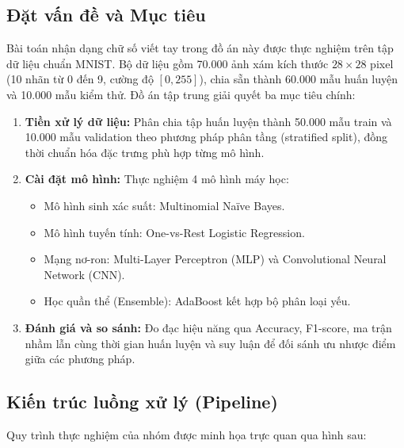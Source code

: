 \documentclass[11pt,a4paper]{article}
\begin{document}
\subsection{Đặt vấn đề và Mục tiêu}
Bài toán nhận dạng chữ số viết tay trong đồ án này được thực nghiệm trên tập dữ liệu chuẩn MNIST. Bộ dữ liệu gồm 70.000 ảnh xám kích thước $28 \times 28$ pixel (10 nhãn từ 0 đến 9, cường độ $[0, 255]$), chia sẵn thành 60.000 mẫu huấn luyện và 10.000 mẫu kiểm thử. Đồ án tập trung giải quyết ba mục tiêu chính:
\begin{enumerate}[noitemsep]
    \item \textbf{Tiền xử lý dữ liệu:} Phân chia tập huấn luyện thành 50.000 mẫu train và 10.000 mẫu validation theo phương pháp phân tầng (stratified split), đồng thời chuẩn hóa đặc trưng phù hợp từng mô hình.
    \item \textbf{Cài đặt mô hình:} Thực nghiệm 4 mô hình máy học:
    \begin{itemize}[noitemsep]
        \item Mô hình sinh xác suất: Multinomial Naïve Bayes.
        \item Mô hình tuyến tính: One-vs-Rest Logistic Regression.
        \item Mạng nơ-ron: Multi-Layer Perceptron (MLP) và Convolutional Neural Network (CNN).
        \item Học quần thể (Ensemble): AdaBoost kết hợp bộ phân loại yếu.
    \end{itemize}
    \item \textbf{Đánh giá và so sánh:} Đo đạc hiệu năng qua Accuracy, F1-score, ma trận nhầm lẫn cùng thời gian huấn luyện và suy luận để đối sánh ưu nhược điểm giữa các phương pháp.
\end{enumerate}

\subsection{Kiến trúc luồng xử lý (Pipeline)}
Quy trình thực nghiệm của nhóm được minh họa trực quan qua hình sau:
\end{document}
